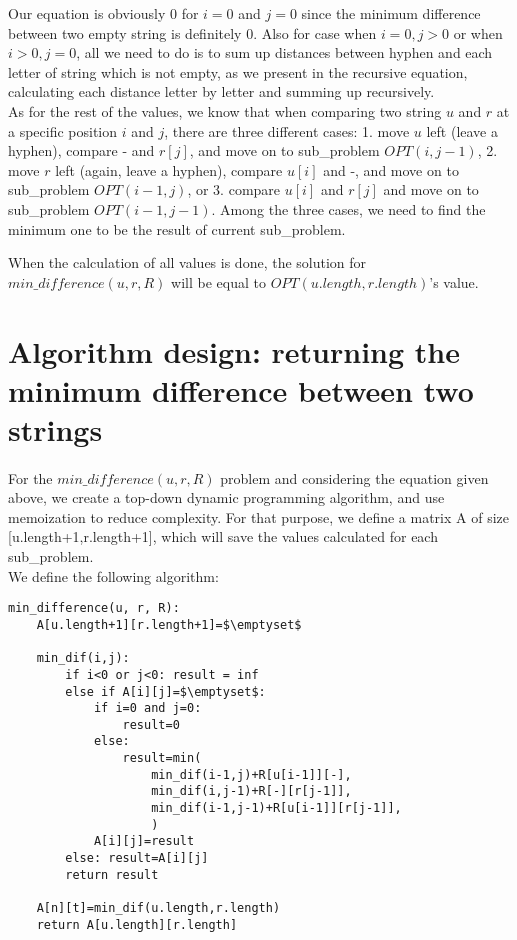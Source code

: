 \documentclass[a4paper,11pt]{article}
\begin{document}
Our equation is obviously 0 for $i=0$ and $j=0$ since the minimum difference between two empty string is definitely 0. Also for case when $i=0, j>0$ or when $i>0, j=0$, all we need to do is to sum up distances between hyphen and each letter of string which is not empty, as we present in the recursive equation, calculating each distance letter by letter and summing up recursively.\\

As for the rest of the values, we know that when comparing two string $u$ and $r$ at a specific position $i$ and $j$, there are three different cases: 1. move $u$ left (leave a hyphen), compare $\mbox{-}$ and $r[j]$, and move on to sub\_problem $OPT(i, j-1)$, 2. move $r$ left (again, leave a hyphen), compare $u[i]$ and $\mbox{-}$, and move on to sub\_problem $OPT(i-1, j)$, or 3. compare $u[i]$ and $r[j]$ and move on to sub\_problem $OPT(i-1, j-1)$. Among the three cases, we need to find the minimum one to be the result of current sub\_problem. 

When the calculation of all values is done, the solution for $min\_difference(u, r, R)$ will be equal to $OPT(u.length,r.length)$'s value.\\

\section{Algorithm design: returning the minimum difference between two strings}
\paragraph{}
For the $min\_difference(u, r, R)$ problem and considering the equation given above, we create a top-down dynamic programming algorithm, and use memoization to reduce complexity. For that purpose, we define a matrix A of size [u.length+1,r.length+1], which will save the values calculated for each sub\_problem.\\
We define the following algorithm:\\

\begin{lstlisting}
min_difference(u, r, R):
    A[u.length+1][r.length+1]=$\emptyset$
    
    min_dif(i,j):
        if i<0 or j<0: result = inf
        else if A[i][j]=$\emptyset$:
            if i=0 and j=0:
                result=0
            else:
                result=min(
                    min_dif(i-1,j)+R[u[i-1]][-], 
                    min_dif(i,j-1)+R[-][r[j-1]], 
                    min_dif(i-1,j-1)+R[u[i-1]][r[j-1]], 
                    )
            A[i][j]=result
        else: result=A[i][j]
        return result
    
    A[n][t]=min_dif(u.length,r.length)
    return A[u.length][r.length]
\end{lstlisting}
    
\end{document}
